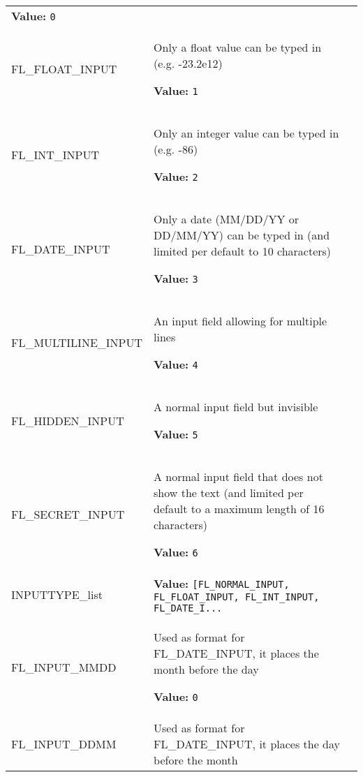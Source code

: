 \begin{longtable}{|p{\varnamewidth}|p{\vardescrwidth}|l}
\textbf{Value:} 
{\tt 0}&\\
\cline{1-2}
\raggedright F\-L\-\_\-F\-L\-O\-A\-T\-\_\-I\-N\-P\-U\-T\- & \raggedright Only a float value can be typed in (e.g. -23.2e12)

\textbf{Value:} 
{\tt 1}&\\
\cline{1-2}
\raggedright F\-L\-\_\-I\-N\-T\-\_\-I\-N\-P\-U\-T\- & \raggedright Only an integer value can be typed in (e.g. -86)

\textbf{Value:} 
{\tt 2}&\\
\cline{1-2}
\raggedright F\-L\-\_\-D\-A\-T\-E\-\_\-I\-N\-P\-U\-T\- & \raggedright Only a date (MM/DD/YY or DD/MM/YY) can be typed in (and limited
per default to 10 characters)

\textbf{Value:} 
{\tt 3}&\\
\cline{1-2}
\raggedright F\-L\-\_\-M\-U\-L\-T\-I\-L\-I\-N\-E\-\_\-I\-N\-P\-U\-T\- & \raggedright An input field allowing for multiple lines

\textbf{Value:} 
{\tt 4}&\\
\cline{1-2}
\raggedright F\-L\-\_\-H\-I\-D\-D\-E\-N\-\_\-I\-N\-P\-U\-T\- & \raggedright A normal input field but invisible

\textbf{Value:} 
{\tt 5}&\\
\cline{1-2}
\raggedright F\-L\-\_\-S\-E\-C\-R\-E\-T\-\_\-I\-N\-P\-U\-T\- & \raggedright A normal input field that does not show the text (and limited
per default to a maximum length of 16 characters)

\textbf{Value:} 
{\tt 6}&\\
\cline{1-2}
\raggedright I\-N\-P\-U\-T\-T\-Y\-P\-E\-\_\-l\-i\-s\-t\- & \raggedright \textbf{Value:} 
{\tt [FL\_NORMAL\_INPUT, FL\_FLOAT\_INPUT, FL\_INT\_INPUT, FL\_DATE\_I\texttt{...}}&\\
\cline{1-2}
\raggedright F\-L\-\_\-I\-N\-P\-U\-T\-\_\-M\-M\-D\-D\- & \raggedright Used as format for FL\_DATE\_INPUT, it places the month before the day

\textbf{Value:} 
{\tt 0}&\\
\cline{1-2}
\raggedright F\-L\-\_\-I\-N\-P\-U\-T\-\_\-D\-D\-M\-M\- & \raggedright Used as format for FL\_DATE\_INPUT, it places the day before the month


\end{longtable}
